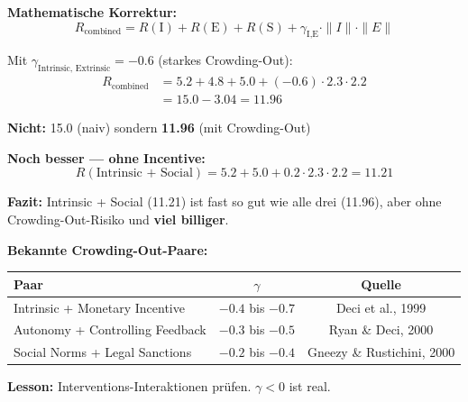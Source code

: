 \begin{tcolorbox}[colback=red!3!white, colframe=red!60!black,
    title=\textbf{Case Study 5: Der Gesundheitsanbieter und der Crowding-Out-Effekt}]
\textbf{Mathematische Korrektur:}
\begin{equation*}
R_{\text{combined}} = R(\text{I}) + R(\text{E}) + R(\text{S}) + \gamma_{\text{I,E}} \cdot \|I\| \cdot \|E\|
\end{equation*}

Mit $\gamma_{\text{Intrinsic, Extrinsic}} = -0.6$ (starkes Crowding-Out):
\begin{align*}
R_{\text{combined}} &= 5.2 + 4.8 + 5.0 + (-0.6) \cdot 2.3 \cdot 2.2 \\
&= 15.0 - 3.04 = \mathbf{11.96}
\end{align*}

\textbf{Nicht:} 15.0 (naiv) sondern \textbf{11.96} (mit Crowding-Out)

\textbf{Noch besser --- ohne Incentive:}
\begin{equation*}
R(\text{Intrinsic + Social}) = 5.2 + 5.0 + 0.2 \cdot 2.3 \cdot 2.2 = \mathbf{11.21}
\end{equation*}

\textbf{Fazit:} Intrinsic + Social (11.21) ist fast so gut wie alle drei (11.96), aber ohne Crowding-Out-Risiko und \textbf{viel billiger}.

\textbf{Bekannte Crowding-Out-Paare:}
\begin{center}
\begin{tabular}{@{}lcc@{}}
\toprule
\textbf{Paar} & $\gamma$ & \textbf{Quelle} \\
\midrule
Intrinsic + Monetary Incentive & $-0.4$ bis $-0.7$ & Deci et al., 1999 \\
Autonomy + Controlling Feedback & $-0.3$ bis $-0.5$ & Ryan \& Deci, 2000 \\
Social Norms + Legal Sanctions & $-0.2$ bis $-0.4$ & Gneezy \& Rustichini, 2000 \\
\bottomrule
\end{tabular}
\end{center}

\textbf{Lesson:} \colorbox{yellow!30}{Interventions-Interaktionen prüfen. $\gamma < 0$ ist real.}

\end{tcolorbox}

